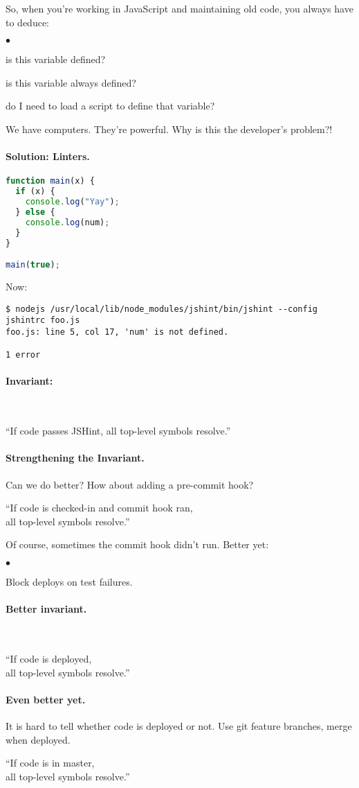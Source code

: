 \documentclass[11pt]{article}
\newcommand{\squishlist}{
 \begin{list}{$\bullet$}
  { \setlength{\itemsep}{0pt}
     \setlength{\parsep}{3pt}
     \setlength{\topsep}{3pt}
     \setlength{\partopsep}{0pt}
     \setlength{\leftmargin}{1.5em}
     \setlength{\labelwidth}{1em}
     \setlength{\labelsep}{0.5em} } }
\newcommand{\squishend}{
  \end{list}  }
\begin{document}
So, when you're working in JavaScript and maintaining old code, you always have to
deduce:
\squishlist
\item is this variable defined?
\item is this variable always defined?
\item do I need to load a script to define that variable?
\squishend
We have computers. They're powerful. Why is this the developer's problem?!

\paragraph{Solution: Linters.}
\begin{lstlisting}[language=JavaScript]
function main(x) {
  if (x) {
    console.log("Yay");
  } else {
    console.log(num);
  }
}

main(true);
\end{lstlisting}

Now:
\begin{verbatim}
$ nodejs /usr/local/lib/node_modules/jshint/bin/jshint --config jshintrc foo.js
foo.js: line 5, col 17, 'num' is not defined.

1 error
\end{verbatim}

\vspace*{-1em}
\paragraph{Invariant:}~\\

\begin{center}
``If code passes JSHint, all top-level symbols resolve.''
\end{center}

\paragraph{Strengthening the Invariant.} Can we do better? How about adding a pre-commit hook?
\begin{center}
``If code is checked-in and commit hook ran,\\ all top-level symbols resolve.''
\end{center}
Of course, sometimes the commit hook didn't run. Better yet:
\squishlist
\item Block deploys on test failures.
\squishend

\paragraph{Better invariant.}~\\[1em]
\begin{center}
``If code is deployed,\\ all top-level symbols resolve.''
\end{center}

\paragraph{Even better yet.}
It is hard to tell whether code is deployed or not.
Use git feature branches, merge when deployed.
\begin{center}
``If code is in master,\\ all top-level symbols resolve.''
\end{center}
\end{document}
